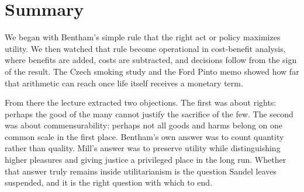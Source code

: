\section{Summary}

We began with Bentham's simple rule that the right act or policy maximizes utility. We then watched that rule become operational in cost-benefit analysis, where benefits are added, costs are subtracted, and decisions follow from the sign of the result. The Czech smoking study and the Ford Pinto memo showed how far that arithmetic can reach once life itself receives a monetary term.

From there the lecture extracted two objections. The first was about rights: perhaps the good of the many cannot justify the sacrifice of the few. The second was about commensurability: perhaps not all goods and harms belong on one common scale in the first place. Bentham's own answer was to count quantity rather than quality. Mill's answer was to preserve utility while distinguishing higher pleasures and giving justice a privileged place in the long run. Whether that answer truly remains inside utilitarianism is the question Sandel leaves suspended, and it is the right question with which to end.
